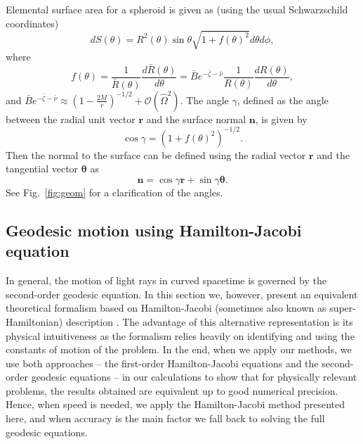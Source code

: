\documentclass{aa}
\newcommand{\be}{\begin{equation}}
\newcommand{\ee}{\end{equation}}
\renewcommand{\vec}[1]{\ensuremath{\boldsymbol{#1}}}
\newcommand{\refe}[1]{#1}
\newcommand{\sch}{Schwarzschild }
\newcommand{\Ob}{\ensuremath{\hat{\Omega}}}
\newcommand{\nub}{\ensuremath{\bar{\nu}}}
\newcommand{\zetab}{\ensuremath{\bar{\zeta}}}
\newcommand{\Bb}{\ensuremath{\bar{B}}}
\begin{document}
Elemental surface area for a spheroid is given as (using the \refe{usual \sch} coordinates)
\be
dS(\theta) = R^2(\theta) \sin\theta \sqrt{1 + f(\theta)^2}d\theta d\phi,
\ee
where
\be
f(\theta) = \frac{1}{\bar{R}(\theta)} \frac{d \bar{R}(\theta)}{d \theta} 
= \Bb e^{-\zetab-\nub} \frac{1}{R(\theta)} \frac{dR(\theta)}{d\theta}, 
\ee
and $\Bb e^{-\zetab-\nub} \approx \left(1-\frac{2 M}{r}\right)^{-1/2} + \mathcal{O}(\Ob^2)$.
The angle $\gamma$, defined as the angle between the radial unit vector $\vec{r}$ and the surface normal $\vec{n}$, is given by
\be
\cos\gamma = \left(1 + f(\theta)^2\right)^{-1/2}.
\ee
Then the normal to the surface can be defined using the radial vector $\vec{r}$ and the tangential vector $\vec{\theta}$ as
\be\label{eq:surf_norm}
\vec{n} = \cos\gamma \vec{r} + \sin\gamma \vec{\theta}.
\ee
See Fig.~\ref{fig:geom} for a clarification of the angles.



\subsection{Geodesic motion \refe{using} Hamilton-Jacobi equation}\label{sect:hamjac}
In general, the motion of light rays in curved spacetime is governed by the second-order geodesic equation.
In this section we, however, present an equivalent theoretical formalism based on Hamilton-Jacobi (sometimes also known as super-Hamiltonian) description \citep{MTW73, cha}.
The advantage of this alternative representation is its physical intuitiveness as the formalism relies heavily on identifying and using the constants of motion of the problem.
In the end, when we apply our methods, we use both approaches -- the first-order Hamilton-Jacobi equations and the second-order geodesic equations -- in our calculations to show that for physically relevant problems, the results obtained are equivalent up to good numerical precision.
Hence, when speed is needed, we apply the Hamilton-Jacobi method presented here, and when accuracy is the main factor we fall back to solving the full geodesic equations.
\end{document}
